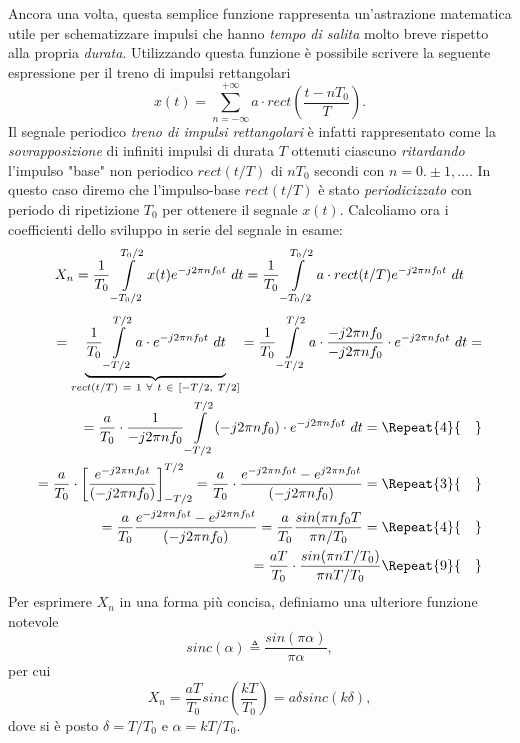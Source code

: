 \documentclass[12pt,oneside,openany]{memoir}
\numberwithin{equation}{subsection}
\newcommand{\quads}[1]{\Repeat{#1}{\quad}}
\newcommand{\dt}{\ dt}
\begin{document}
Ancora una volta, questa semplice funzione rappresenta un'astrazione matematica utile per schematizzare impulsi che hanno \textit{tempo di salita} molto breve rispetto alla propria \textit{durata}. Utilizzando questa funzione \`e possibile scrivere la seguente espressione per il treno di impulsi rettangolari
\begin{equation}
	x(t) = \sum_{n = -\infty}^{+\infty} a \cdot rect\left(\frac{t - nT_0}{T}\right).
\end{equation}
Il segnale periodico \textit{treno di impulsi rettangolari} \`e infatti rappresentato come la \textit{sovrapposizione} di infiniti impulsi di durata $T$ ottenuti ciascuno \textit{ritardando} l'impulso "base" non periodico $rect(t/T)$ di $nT_0$ secondi con $n = 0. \pm1,\dots$. In questo caso diremo che l'impulso-base $rect(t/T)$ \`e stato \textit{periodicizzato} con periodo di ripetizione $T_0$ per ottenere il segnale $x(t)$.
\bigbreak
Calcoliamo ora i coefficienti dello sviluppo in serie del segnale in esame:
\[
	X_n = \frac{1}{T_0} \int\displaylimits_{-T_0/2}^{T_0/2} x(t) e^{-j 2 \pi n f_0 t} \dt = \frac{1}{T_0} \int\displaylimits_{-T_0/2}^{T_0/2} a \cdot rect(t/T) e^{-j 2 \pi n f_0 t} \dt
\]
\begin{equation}
	\begin{split}
		= \underbrace{\frac{1}{T_0} \int\displaylimits_{-T/2}^{T/2} a \cdot e^{-j 2 \pi n f_0 t} \dt}_{rect(t/T) \ = \ 1 \ \forall \ t \ \in \ [-T/2, \ T/2]} = \frac{1}{T_0} \int\displaylimits_{-T/2}^{T/2} a \cdot \frac{-j 2 \pi n f_0}{-j 2 \pi n f_0} \cdot e^{-j 2 \pi n f_0 t} \dt =
		\\
		= \frac{a}{T_0} \cdot \frac{1}{-j 2 \pi n f_0} \int\displaylimits_{-T/2}^{T/2} (-j 2 \pi n f_0) \cdot e^{-j 2 \pi n f_0 t} \dt =
		\quads{4}
		\\
		= \frac{a}{T_0} \cdot \left[\frac{e^{-j 2 \pi n f_0 t}}{(-j 2 \pi n f_0)}\right]_{-T/2}^{T/2} = \frac{a}{T_0} \cdot \frac{e^{-j 2 \pi n f_0 t} - e^{j 2 \pi n f_0 t}}{(-j 2 \pi n f_0)} =
		\quads{3}
		\\
		= \frac{a}{T_0} \frac{e^{-j 2 \pi n f_0 t} - e^{j 2 \pi n f_0 t}}{(-j 2 \pi n f_0)} = \frac{a}{T_0} \frac{sin(\pi n f_0 T}{\pi n / T_0} =
		\quads{4}
		\\
		= \frac{a T}{T_0} \cdot \frac{sin(\pi n T/T_0)}{\pi n T/T_0}
		\quads{9}
		\\
	\end{split}
\end{equation}
Per esprimere $X_n$ in una forma pi\`u concisa, definiamo una ulteriore funzione notevole
\begin{equation}
	sinc(\alpha) \triangleq \frac{sin(\pi \alpha)}{\pi \alpha},
\end{equation}
per cui
\begin{equation}
	X_n = \frac{aT}{T_0} sinc(\frac{kT}{T_0}) = a \delta sinc(k \delta),
\end{equation}
dove si \`e posto $\delta = T/T_0$ e $\alpha = kT/T_0$.
\end{document}
